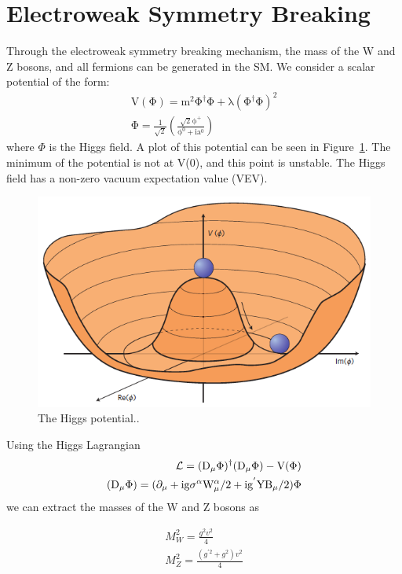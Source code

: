 \section{Electroweak Symmetry Breaking}
Through the electroweak symmetry breaking mechanism, the mass of the W and Z bosons, and all fermions can be generated in the SM.  
We consider a scalar potential of the form:
\begin{eqnarray}
\mathrm{ V(\Phi) = m^{2} \Phi^{\dagger} \Phi + \lambda ( \Phi^{\dagger} \Phi )^{2}  }\\
\mathrm{\Phi = \frac{1}{\sqrt{2}} \left( \frac{\sqrt{2} \phi^{+}}{\phi^{0} + ia^{0}}  \right)}
\end{eqnarray}  
where $\Phi$ is the Higgs field.  A plot of this potential can be seen in Figure~\ref{figs:higgspotential}.  
The minimum of the potential is not at V(0), and this point is unstable.  
The Higgs field has a non-zero vacuum expectation value (VEV).

\begin{figure}
\begin{center}
\includegraphics[width=0.7\linewidth]{figs/higgspotential.png}
\caption{The Higgs potential..}
\label{figs:higgspotential}
\end{center}
\end{figure}

Using the Higgs Lagrangian
\begin{eqnarray}
\cal{L} = \mathrm{(D_{\mu} \Phi )^{\dagger}(D_{\mu} \Phi ) -V( \Phi )}\\
\mathrm{(D_{\mu}\Phi) = (\partial_{\mu}+i g \sigma^{\alpha} W_{\mu}^{\alpha}/2 +i g^{'} Y B_{\mu}/2)\Phi}
\end{eqnarray}  
we can extract the masses of the W and Z bosons as

\begin{eqnarray}
M_{W}^2 = \frac{g^{2}v^{2}}{4}\\
M_{Z}^2 = \frac{(g^{'2}+g^{2})v^{2}}{4}
\end{eqnarray}  

